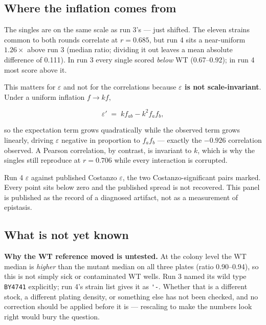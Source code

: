 \subsection{Where the inflation comes from}
\label{sec:wtshift}

The singles are on the same scale as run 3's --- just shifted. The eleven strains common to
both rounds correlate at \textbf{$r=0.685$}, but run 4 sits a near-uniform
\textbf{$1.26\times$} above run 3 (median ratio; dividing it out leaves a mean absolute
difference of 0.111). In run 3 every single scored \emph{below} WT (0.67--0.92); in run 4
most score above it.

This matters for $\varepsilon$ and not for the correlations because \textbf{$\varepsilon$ is
not scale-invariant}. Under a uniform inflation $f \to k f$,

\begin{equation}
  \varepsilon' \;=\; k f_{ab} - k^{2} f_a f_b,
\end{equation}

so the expectation term grows quadratically while the observed term grows linearly, driving
$\varepsilon$ negative in proportion to $f_a f_b$ --- exactly the $-0.926$ correlation
observed. A Pearson correlation, by contrast, is invariant to $k$, which is why the singles
still reproduce at $r=0.706$ while every interaction is corrupted.

%
  {Run 4 $\varepsilon$ against published Costanzo $\varepsilon$, the two Costanzo-significant
   pairs marked. Every point sits below zero and the published spread is not recovered. This
   panel is published as the record of a diagnosed artifact, not as a measurement of
   epistasis.}

\subsection{What is not yet known}

\textbf{Why the WT reference moved is untested.} At the colony level the WT median is
\emph{higher} than the mutant median on all three plates (ratio 0.90--0.94), so this is not
simply sick or contaminated WT wells. Run 3 named its wild type \texttt{BY4741} explicitly;
run 4's strain list gives it as \verb|'-|. Whether that is a different stock, a different
plating density, or something else has not been checked, and no correction should be applied
before it is --- rescaling to make the numbers look right would bury the question.

